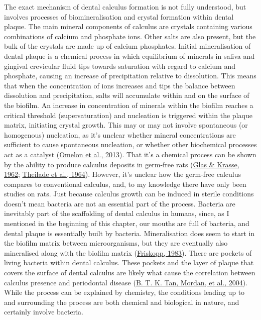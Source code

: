 \documentclass[
  letterpaper,
]{book}
\begin{document}
The exact mechanism of dental calculus formation is not fully
understood, but involves processes of biomineralisation and crystal
formation within dental plaque. The main mineral components of calculus
are crystals containing various combinations of calcium and phosphate
ions. Other salts are also present, but the bulk of the crystals are
made up of calcium phosphates. Initial mineralisation of dental plaque
is a chemical process in which equilibrium of minerals in saliva and
gingival crevicular fluid tips towards saturation with regard to calcium
and phosphate, causing an increase of precipitation relative to
dissolution. This means that when the concentration of ions increases
and tips the balance between dissolution and precipitation, salts will
accumulate within and on the surface of the biofilm. An increase in
concentration of minerals within the biofilm reaches a critical
threshold (supersaturation) and nucleation is triggered within the
plaque matrix, initiating crystal growth. This may or may not involve
spontaneous (or homogenous) nucleation, as it's unclear whether mineral
concentrations are sufficient to cause spontaneous nucleation, or
whether other biochemical processes act as a catalyst
(\protect\hyperlink{ref-omelonReviewPhosphate2013}{Omelon et al.,
2013}). That it's a chemical process can be shown by the ability to
produce calculus deposits in germ-free rats
(\protect\hyperlink{ref-glasBiophysicalStudies1962}{Glas \& Krasse,
1962}; \protect\hyperlink{ref-theiladeGermfreeCalculus1964}{Theilade et
al., 1964}). However, it's unclear how the germ-free calculus compares
to conventional calculus, and, to my knowledge there have only been
studies on rats. Just because calculus growth can be induced in sterile
conditions doesn't mean bacteria are not an essential part of the
process. Bacteria are inevitably part of the scaffolding of dental
calculus in humans, since, as I mentioned in the beginning of this
chapter, our mouths are full of bacteria, and dental plaque is
essentially built by bacteria. Mineralisation does seem to start in the
biofilm matrix between microorganisms, but they are eventually also
mineralised along with the biofilm matrix
(\protect\hyperlink{ref-friskoppUltrastructureNondecalcified1983}{Friskopp,
1983}). There are pockets of living bacteria within dental calculus.
These pockets and the layer of plaque that covers the surface of dental
calculus are likely what cause the correlation between calculus presence
and periodontal disease
(\protect\hyperlink{ref-tanBacterialViability2004}{B. T. K. Tan, Mordan,
et al., 2004}). While the process can be explained by chemistry, the
conditions leading up to and surrounding the process are both chemical
and biological in nature, and certainly involve bacteria.
\end{document}
